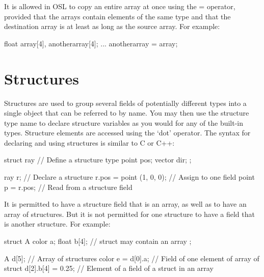 \documentclass[11pt,letterpaper]{book}
\begin{document}
It is allowed in OSL to copy an entire array at once using the {\cf =}
operator, provided that the arrays contain elements of the same type
and that the destination array is at least as long as the source
array.  For example:

\begin{code}
    float array[4], anotherarray[4];
    ...
    anotherarray = array;
\end{code}


\section{Structures}
\label{sec:types:struct}
  

Structures are used to group several fields of potentially different
types into a single object that can be referred to by name.  You may
then use the structure type name to declare structure variables as you
would for any of the built-in types.  Structure elements are accessed
using the `dot' operator.  The syntax for declaring and using structures
is similar to C or C++:

\begin{code}
    struct ray {                   // Define a structure type
        point pos;
        vector dir;
    };

    ray r;                         // Declare a structure
    r.pos = point (1, 0, 0);       // Assign to one field
    point p = r.pos;               // Read from a structure field
\end{code}

It is permitted to have a structure field that is an array, as well as
to have an array of structures.  But it is not permitted for one
structure to have a field that is another structure.  For example:

\begin{code}
    struct A {
        color a;
        float b[4];       // struct may contain an array
    };

    A d[5];               // Array of structures
    color e = d[0].a;     // Field of one element of array of struct
    d[2].b[4] = 0.25;     // Element of a field of a struct in an array
\end{code}

\end{document}
